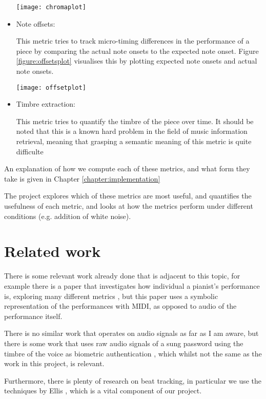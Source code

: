 \documentclass[oneside, class=book, crop=false, 12pt]{standalone}
\begin{document}
\begin{itemize}
    \begin{minipage}{\textwidth}
      \centering
      \texttt{[image: chromaplot]}
      \label{figure:chromaplot}
        
    \end{minipage}

  \item
    Note offsets:

    This metric tries to track micro-timing differences in the performance of a piece by comparing the actual note onsets to the expected note onset. Figure \ref{figure:offsetsplot} visualises this by plotting expected note onsets and actual note onsets.

\begin{minipage}{\textwidth}
  \centering
  \texttt{[image: offsetplot]}
  \label{figure:offsetsplot}
\end{minipage}



  \item
    Timbre extraction:

    This metric tries to quantify the timbre of the piece over time. It should be noted that this is a known hard problem in the field of music information retrieval, meaning that grasping a semantic meaning of this metric is quite difficulte
\end{itemize}





An explanation of how we compute each of these metrics, and what form they take is given in Chapter \ref{chapter:implementation}

The project explores which of these metrics are most useful, and quantifies the usefulness of each metric, and looks at how the metrics perform under different conditions (e.g. addition of white noise).


\section{Related work}

There is some relevant work already done that is adjacent to this topic, for example there is a paper that investigates how individual a pianist's performance is, exploring many different metrics \cite{bernays14}, but this paper uses a symbolic representation of the performances with MIDI, as opposed to audio of the performance itself.

There is no similar work that operates on audio signals as far as I am aware, but there is some work that uses raw audio signals of a sung password using the timbre of the voice as biometric authentication \cite{prakash16}, which whilst not the same as the work in this project, is relevant.

Furthermore, there is plenty of research on beat tracking, in particular we use the techniques by Ellis \cite{ellis07}, which is a vital component of our project.


\ifstandalone
  \printbibliography[heading=subbibliography]
\fi
    
\end{document}

